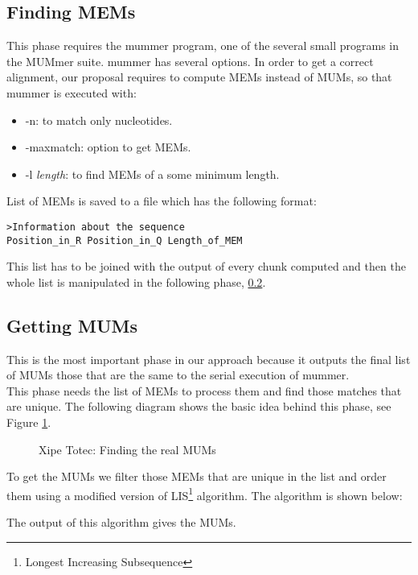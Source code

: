 \documentclass[3p,times]{elsarticle}
\begin{document}
\subsection{Finding MEMs}
This phase requires the mummer program, one of the several small programs in the MUMmer suite. mummer has several options.
In order to get a correct alignment, our proposal requires to compute MEMs instead of MUMs, so that mummer is executed with:
\begin{itemize}
  \item -n: to match only nucleotides.
  \item -maxmatch: option to get MEMs.
  \item -l \emph{length}: to find MEMs of a some minimum length.
\end{itemize}
List of MEMs is saved to a file which has the following format:
\begin{verbatim}
>Information about the sequence
Position_in_R Position_in_Q Length_of_MEM
\end{verbatim}
This list has to be joined with the output of every chunk computed and then the whole list is  manipulated in the following phase, \ref{getting}.
\subsection{Getting MUMs}
\label{getting}
This is the most important phase in our approach because it outputs the final list of MUMs those that are the same to the serial execution of mummer.\\
This phase needs the list of MEMs to process them and find those matches that are unique. The following diagram shows the basic idea behind this phase, see Figure \ref{xt}.
\begin{figure}[htb]  
 \begin{center} 
 \end{center} 
 \caption{Xipe Totec: Finding the real MUMs} 
   \label{xt} 
\end{figure}
To get the MUMs we filter those MEMs that are unique in the list and order them using a modified version of LIS\footnote{Longest Increasing Subsequence} algorithm.
The algorithm is shown below:
\begin{algorithmic}
\ELSE {}
\ENDIF
\ENDFOR
{}
\ELSE {}
\ENDIF
\ENDFOR
\end{algorithmic}
The output of this algorithm gives the MUMs.
\end{document}

